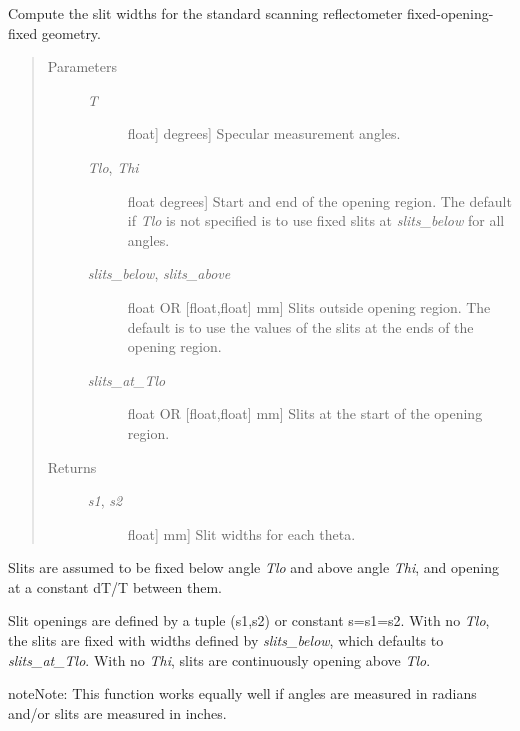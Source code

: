\documentclass[letterpaper,10pt,english]{sphinxmanual}
\begin{document}
\begin{fulllineitems}
\label{api/resolution:refl1d.resolution.slit_widths}
Compute the slit widths for the standard scanning reflectometer
fixed-opening-fixed geometry.
\begin{quote}\begin{description}
\item[{Parameters }] \leavevmode\begin{description}
\item[{\emph{T}}] \leavevmode{[}{[}float{]} \textbar{} degrees{]}
Specular measurement angles.

\item[{\emph{Tlo}, \emph{Thi}}] \leavevmode{[}float \textbar{} degrees{]}
Start and end of the opening region.  The default if \emph{Tlo} is
not specified is to use fixed slits at \emph{slits\_below} for all
angles.

\item[{\emph{slits\_below}, \emph{slits\_above}}] \leavevmode{[}float OR {[}float,float{]} \textbar{} mm{]}
Slits outside opening region.  The default is to use the
values of the slits at the ends of the opening region.

\item[{\emph{slits\_at\_Tlo}}] \leavevmode{[}float OR {[}float,float{]} \textbar{} mm{]}
Slits at the start of the opening region.

\end{description}

\item[{Returns }] \leavevmode\begin{description}
\item[{\emph{s1}, \emph{s2}}] \leavevmode{[}{[}float{]} \textbar{} mm{]}
Slit widths for each theta.

\end{description}

\end{description}\end{quote}

Slits are assumed to be fixed below angle \emph{Tlo} and above angle \emph{Thi},
and opening at a constant dT/T between them.

Slit openings are defined by a tuple (s1,s2) or constant s=s1=s2.
With no \emph{Tlo}, the slits are fixed with widths defined by \emph{slits\_below},
which defaults to \emph{slits\_at\_Tlo}.  With no \emph{Thi}, slits are continuously
opening above \emph{Tlo}.

\begin{notice}{note}{Note:}
This function works equally well if angles are measured in
radians and/or slits are measured in inches.
\end{notice}

\end{fulllineitems}
\end{document}
